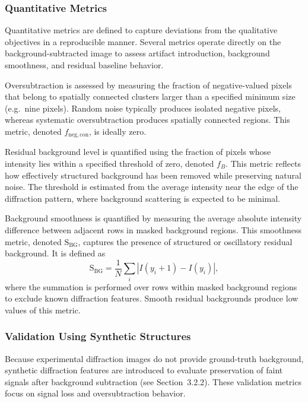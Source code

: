 \documentclass[iucr]{iucrjournals}
\begin{document}
\subsubsection{Quantitative Metrics}

Quantitative metrics are defined to capture deviations from the qualitative objectives in a reproducible manner. Several metrics operate directly on the background-subtracted image to assess artifact introduction, background smoothness, and residual baseline behavior.

Oversubtraction is assessed by measuring the fraction of negative-valued pixels that belong to spatially connected clusters larger than a specified minimum size (e.g.\ nine pixels). Random noise typically produces isolated negative pixels, whereas systematic oversubtraction produces spatially connected regions. This metric, denoted $f_{\mathrm{neg,con}}$, is ideally zero.

Residual background level is quantified using the fraction of pixels whose intensity lies within a specified threshold of zero, denoted $f_{B}$. This metric reflects how effectively structured background has been removed while preserving natural noise. The threshold is estimated from the average intensity near the edge of the diffraction pattern, where background scattering is expected to be minimal.

Background smoothness is quantified by measuring the average absolute intensity difference between adjacent rows in masked background regions. This smoothness metric, denoted $\mathrm{S}_{\mathrm{BG}}$, captures the presence of structured or oscillatory residual background. It is defined as
\begin{equation}
\mathrm{S}_{\mathrm{BG}} =
\frac{1}{N} \sum_i \left| I(y_i + 1) - I(y_i) \right|,
\end{equation}
where the summation is performed over rows within masked background regions to exclude known diffraction features. Smooth residual backgrounds produce low values of this metric.

\subsubsection{Validation Using Synthetic Structures}

Because experimental diffraction images do not provide ground-truth background, synthetic diffraction features are introduced to evaluate preservation of faint signals after background subtraction (see Section~3.2.2). These validation metrics focus on signal loss and oversubtraction behavior.
\end{document}
